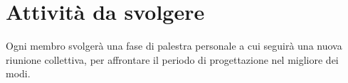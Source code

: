 \documentclass[a4paper,12pt]{article}
\newcommand{\DataVerbale}{2026/03/05}
\begin{document}
\section{Attività da svolgere}{
    Ogni membro svolgerà una fase di palestra personale a cui seguirà una nuova riunione collettiva, per affrontare il periodo di progettazione nel migliore dei modi.
}
\end{document}
